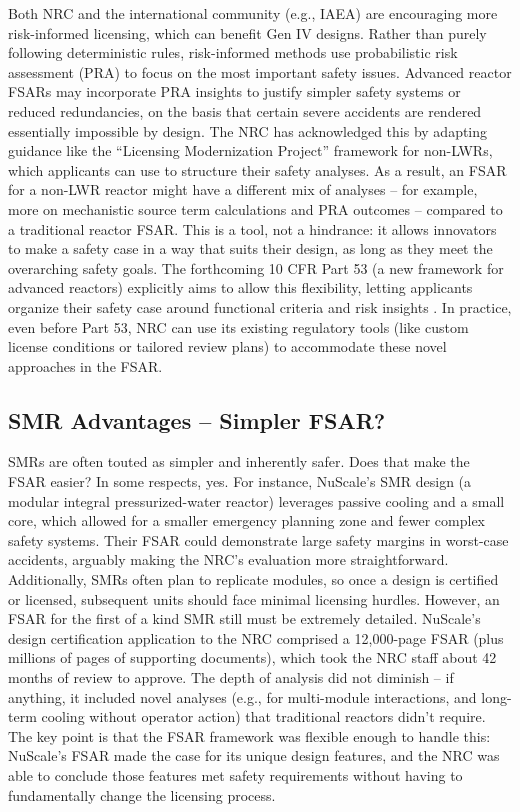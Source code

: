 \documentclass[5p,authoryear]{elsarticle}
\begin{document}
Both NRC and the international community (e.g., IAEA) are encouraging more risk-informed licensing, which can benefit Gen IV designs. Rather than purely following deterministic rules, risk-informed methods use probabilistic risk assessment (PRA) to focus on the most important safety issues. Advanced reactor FSARs may incorporate PRA insights to justify simpler safety systems or reduced redundancies, on the basis that certain severe accidents are rendered essentially impossible by design. The NRC has acknowledged this by adapting guidance like the “Licensing Modernization Project” framework for non-LWRs, which applicants can use to structure their safety analyses. As a result, an FSAR for a non-LWR reactor might have a different mix of analyses – for example, more on mechanistic source term calculations and PRA outcomes – compared to a traditional reactor FSAR. This is a tool, not a hindrance: it allows innovators to make a safety case in a way that suits their design, as long as they meet the overarching safety goals. The forthcoming 10 CFR Part 53 (a new framework for advanced reactors) explicitly aims to allow this flexibility, letting applicants organize their safety case around functional criteria and risk insights \cite{Righetti2025}. In practice, even before Part 53, NRC can use its existing regulatory tools (like custom license conditions or tailored review plans) to accommodate these novel approaches in the FSAR.

\subsection{SMR Advantages – Simpler FSAR?}
\vspace{0.2cm}

SMRs are often touted as simpler and inherently safer. Does that make the FSAR easier? In some respects, yes. For instance, NuScale's SMR design (a modular integral pressurized-water reactor) leverages passive cooling and a small core, which allowed for a smaller emergency planning zone and fewer complex safety systems. Their FSAR could demonstrate large safety margins in worst-case accidents, arguably making the NRC's evaluation more straightforward. Additionally, SMRs often plan to replicate modules, so once a design is certified or licensed, subsequent units should face minimal licensing hurdles. However, an FSAR for the first of a kind SMR still must be extremely detailed. NuScale's design certification application to the NRC comprised a 12,000-page FSAR (plus millions of pages of supporting documents), which took the NRC staff about 42 months of review to approve. The depth of analysis did not diminish – if anything, it included novel analyses (e.g., for multi-module interactions, and long-term cooling without operator action) that traditional reactors didn't require. The key point is that the FSAR framework was flexible enough to handle this: NuScale's FSAR made the case for its unique design features, and the NRC was able to conclude those features met safety requirements without having to fundamentally change the licensing process.
\end{document}

